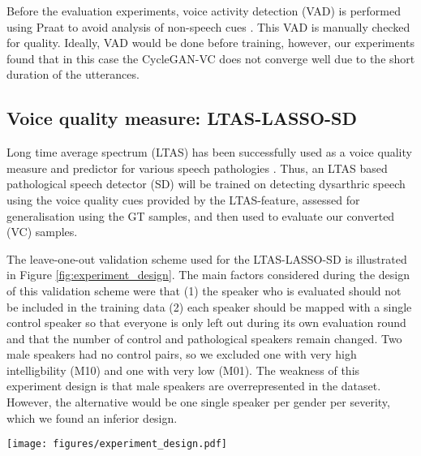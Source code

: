\documentclass[a4paper]{article}
\begin{document}
Before the evaluation experiments, voice activity detection (VAD) is performed using Praat to avoid analysis of non-speech cues \cite{boersma2011praat}. This VAD is manually checked for quality. Ideally, VAD would be done before training, however, our experiments found that in this case the CycleGAN-VC does not converge well due to the short duration of the utterances.

\subsection{Voice quality measure: LTAS-LASSO-SD}
\label{sec:ltas-lasso-sd}

Long time average spectrum (LTAS) has been successfully used as a voice quality measure \cite{master2006long} and predictor for various speech pathologies \cite{halpern2020detecting,smith2014long}. Thus, an LTAS based pathological speech detector (SD) will be trained on detecting dysarthric speech using the voice quality cues provided by the LTAS-feature, assessed for generalisation using the GT samples, and then used to evaluate our converted (VC) samples. 

The leave-one-out validation scheme used for the LTAS-LASSO-SD is illustrated in Figure \ref{fig:experiment_design}. The main factors considered during the design of this validation scheme were that (1) the speaker who is evaluated should not be included in the training data (2) each speaker should be mapped with a single control speaker so that everyone is only left out during its own evaluation round and that the number of control and pathological speakers remain changed.
Two male speakers had no control pairs, so we excluded one with very high intelligbility (M10) and one with very low (M01). The weakness of this experiment design is that male speakers are overrepresented in the dataset. However, the alternative would be one single speaker per gender per severity, which we found an inferior design. 

\begin{figure*}[t]
    \centering
    \texttt{[image: figures/experiment\_design.pdf]}
    \caption{Leave-one-out validation scheme for LTAS-LASSO-SD. Purple colour shows the excluded speakers. The conversion pair (red) is excluded from the evaluation, and in each fold a different speaker pair (yellow) is left out. The green colour shows the speakers that we are training on. This is repeated for the two genders separately.}
    \label{fig:experiment_design}
\end{figure*}
\end{document}
